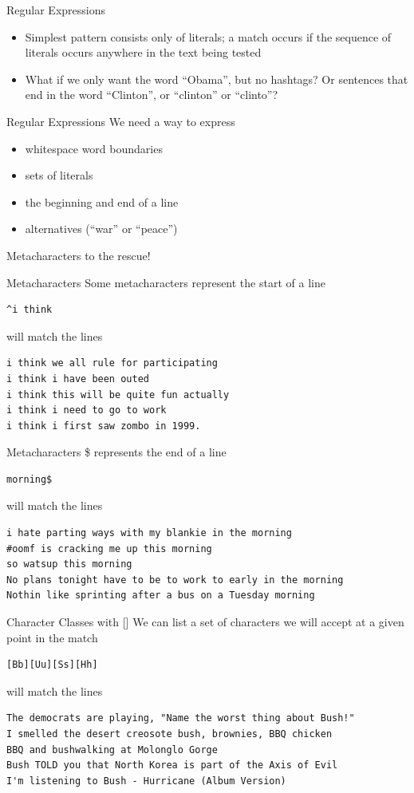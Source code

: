 \documentclass{beamer}
\begin{document}
\begin{frame}{Regular Expressions}
\begin{itemize}
\item
Simplest pattern consists only of literals; a match occurs if the
sequence of literals occurs anywhere in the text being tested
\item
What if we only want the word ``Obama'', but no hashtags? Or sentences that end in 
the word ``Clinton'', or ``clinton'' or ``clinto''? 
\end{itemize}
\end{frame}

\begin{frame}{Regular Expressions}
We need a way to express
\begin{itemize}
\item
whitespace word boundaries
\item
sets of literals
\item
the beginning and end of a line
\item
alternatives (``war'' or ``peace'')
\end{itemize}
Metacharacters to the rescue!
\end{frame}

\begin{frame}[fragile]{Metacharacters}
Some metacharacters represent the start of a line
\begin{verbatim}
^i think 
\end{verbatim}
will match the lines 
\begin{verbatim}
i think we all rule for participating
i think i have been outed
i think this will be quite fun actually
i think i need to go to work
i think i first saw zombo in 1999.
\end{verbatim}
\end{frame}

\begin{frame}[fragile]{Metacharacters}
\$ represents the end of a line
\begin{verbatim}
morning$ 
\end{verbatim}
will match the lines 
\begin{verbatim}
i hate parting ways with my blankie in the morning
#oomf is cracking me up this morning
so watsup this morning
No plans tonight have to be to work to early in the morning
Nothin like sprinting after a bus on a Tuesday morning
\end{verbatim}
\end{frame}

\begin{frame}[fragile]{Character Classes with []}
We can list a set of characters we will accept at a given point in the
match
\begin{verbatim}
[Bb][Uu][Ss][Hh]
\end{verbatim}
will match the lines 
\begin{verbatim}
The democrats are playing, "Name the worst thing about Bush!"
I smelled the desert creosote bush, brownies, BBQ chicken
BBQ and bushwalking at Molonglo Gorge
Bush TOLD you that North Korea is part of the Axis of Evil 
I'm listening to Bush - Hurricane (Album Version)
\end{verbatim}
\end{frame}
\end{document}
